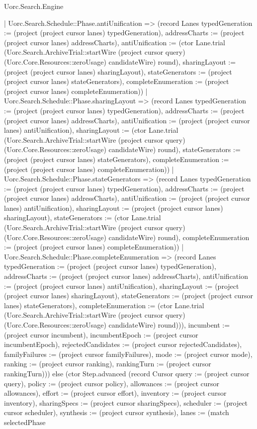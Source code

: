 \begin{lexlean}{Uorc.Search.Engine}
\begin{semanticmodule}
{{      | Uorc.Search.Schedule::Phase.antiUnification => (record Lanes {typedGeneration := (project (project cursor lanes) typedGeneration), addressCharts := (project (project cursor lanes) addressCharts), antiUnification := (ctor Lane.trial (Uorc.Search.ArchiveTrial::startWire (project cursor query) (Uorc.Core.Resources::zeroUsage) candidateWire) round), sharingLayout := (project (project cursor lanes) sharingLayout), stateGenerators := (project (project cursor lanes) stateGenerators), completeEnumeration := (project (project cursor lanes) completeEnumeration)})
      | Uorc.Search.Schedule::Phase.sharingLayout => (record Lanes {typedGeneration := (project (project cursor lanes) typedGeneration), addressCharts := (project (project cursor lanes) addressCharts), antiUnification := (project (project cursor lanes) antiUnification), sharingLayout := (ctor Lane.trial (Uorc.Search.ArchiveTrial::startWire (project cursor query) (Uorc.Core.Resources::zeroUsage) candidateWire) round), stateGenerators := (project (project cursor lanes) stateGenerators), completeEnumeration := (project (project cursor lanes) completeEnumeration)})
      | Uorc.Search.Schedule::Phase.stateGenerators => (record Lanes {typedGeneration := (project (project cursor lanes) typedGeneration), addressCharts := (project (project cursor lanes) addressCharts), antiUnification := (project (project cursor lanes) antiUnification), sharingLayout := (project (project cursor lanes) sharingLayout), stateGenerators := (ctor Lane.trial (Uorc.Search.ArchiveTrial::startWire (project cursor query) (Uorc.Core.Resources::zeroUsage) candidateWire) round), completeEnumeration := (project (project cursor lanes) completeEnumeration)})
      | Uorc.Search.Schedule::Phase.completeEnumeration => (record Lanes {typedGeneration := (project (project cursor lanes) typedGeneration), addressCharts := (project (project cursor lanes) addressCharts), antiUnification := (project (project cursor lanes) antiUnification), sharingLayout := (project (project cursor lanes) sharingLayout), stateGenerators := (project (project cursor lanes) stateGenerators), completeEnumeration := (ctor Lane.trial (Uorc.Search.ArchiveTrial::startWire (project cursor query) (Uorc.Core.Resources::zeroUsage) candidateWire) round)})), incumbent := (project cursor incumbent), incumbentEpoch := (project cursor incumbentEpoch), rejectedCandidates := (project cursor rejectedCandidates), familyFailures := (project cursor familyFailures), mode := (project cursor mode), ranking := (project cursor ranking), rankingTurn := (project cursor rankingTurn)})) else (ctor Step.advanced (record Cursor {query := (project cursor query), policy := (project cursor policy), allowances := (project cursor allowances), effort := (project cursor effort), inventory := (project cursor inventory), sharingSpecs := (project cursor sharingSpecs), scheduler := (project cursor scheduler), synthesis := (project cursor synthesis), lanes := (match selectedPhase
}}
\end{semanticmodule}
\end{lexlean}
